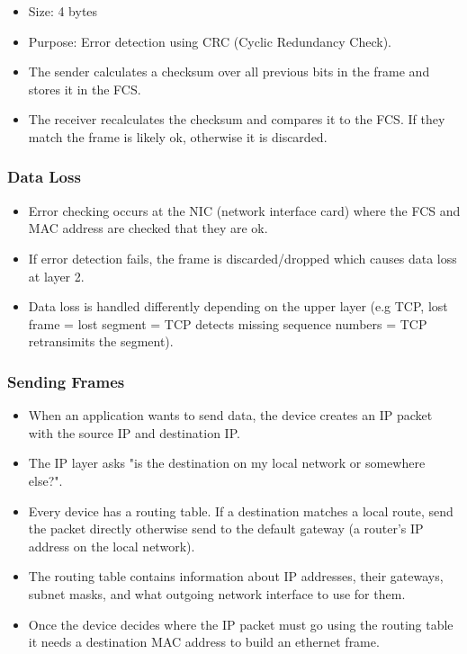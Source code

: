 \documentclass{article}
\begin{document}
\begin{itemize}
    \item Size: 4 bytes
    \item Purpose: Error detection using CRC (Cyclic Redundancy Check).
    \item The sender calculates a checksum over all previous bits in the frame and stores it in the FCS.
    \item The receiver recalculates the checksum and compares it to the FCS. If they match the frame is likely ok, otherwise it is discarded.
\end{itemize}

\subsubsection{Data Loss}

\begin{itemize}
    \item Error checking occurs at the NIC (network interface card) where the FCS and MAC address are checked that they are ok.
    \item If error detection fails, the frame is discarded/dropped which causes data loss at layer 2.
    \item Data loss is handled differently depending on the upper layer (e.g TCP, lost frame = lost segment = TCP detects missing sequence numbers = TCP retransimits the segment).
\end{itemize}

\subsubsection{Sending Frames}

\begin{itemize}
    \item When an application wants to send data, the device creates an IP packet with the source IP and destination IP.
    \item The IP layer asks "is the destination on my local network or somewhere else?".
    \item Every device has a routing table. If a destination matches a local route, send the packet directly otherwise send to the default gateway (a router's IP address on the local network).
    \item The routing table contains information about IP addresses, their gateways, subnet masks, and what outgoing network interface to use for them.
    \item Once the device decides where the IP packet must go using the routing table it needs a destination MAC address to build an ethernet frame.
\end{itemize}
\end{document}
